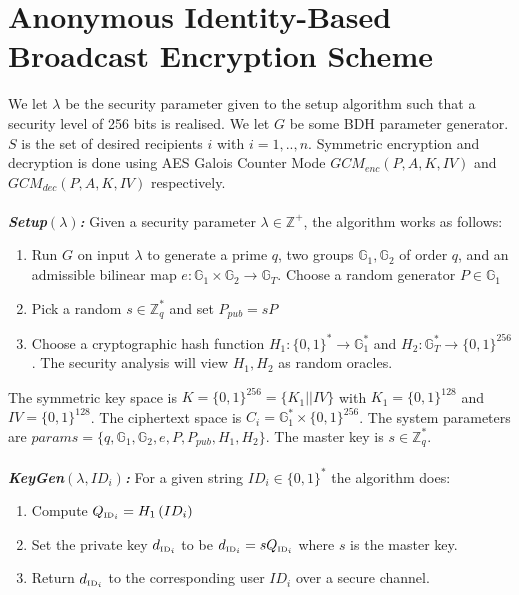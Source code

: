\documentclass[11pt]{article}
\begin{document}
\section*{Anonymous Identity-Based Broadcast Encryption Scheme}
We let $\lambda$ be the security parameter given to the setup algorithm such that a security level of 256 bits is realised. We let $G$ be some BDH parameter generator. $S$ is the set of desired recipients $i$ with $i = 1,..,n$. Symmetric encryption and decryption is done using AES Galois Counter Mode  $GCM_{enc} \left( P, A, K, IV \right)$ and  $GCM_{dec} \left( P, A, K, IV \right)$ respectively.\\
\\
\textbf{\textit{Setup$\left( \lambda \right)$:}} Given a security parameter $\lambda \in \mathds{Z}^{+}$, the algorithm works as follows:
\begin{enumerate}
 \item Run $G$ on input $\lambda$ to generate a prime $q$, two groups $\mathds{G}_1, \mathds{G}_2$ of order $q$, and an admissible bilinear map $e: \mathds{G}_1 \times \mathds{G}_2 \rightarrow \mathds{G}_T$. Choose a random generator $P \in \mathds{G}_1$
 \item Pick a random $s \in \mathds{Z}^{*}_q$ and set $P_{pub} = sP$
 \item Choose a cryptographic hash function $H_1: \{ 0,1 \}^{*} \rightarrow \mathds{G}_1^{*}$ and $H_2: \mathds{G}_T^{*} \rightarrow \{ 0,1 \}^{256}$. The security analysis will view $H_1, H_2$ as random oracles.
\end{enumerate}

The symmetric key space is $K = \{ 0,1 \}^{256} = \{ K_1 || IV \}$ with $K_1 = \{ 0,1 \}^{128}$ and $IV = \{ 0,1 \}^{128}$. The ciphertext space is $C_i = \mathds{G}_1^{*} \times \{ 0,1 \}^{256}$. The system parameters are $params = \{ q, \mathds{G}_1, \mathds{G}_2, e, P, P_{pub}, H_1, H_2  \}$. The master key is $s \in \mathds{Z}_q^{*}$.\\
\\
\textbf{\textit{KeyGen$\left( \lambda,ID_i \right)$:}} For a given string $ID_i \in \{ 0,1 \}^{*}$ the algorithm does:
\begin{enumerate}
 \item Compute $Q_{\textrm{\tiny{ID}}_i} = H_1 \left( ID_{i} \right)$
 \item Set the private key $d_{\textrm{\tiny{ID}}_i}$ to be $d_{\textrm{\tiny{ID}}_i} = s Q_{\textrm{\tiny{ID}}_i}$ where $s$ is the master key.
 \item Return $d_{\textrm{\tiny{ID}}_i}$ to the corresponding user $ID_i$ over a secure channel.
\end{enumerate}
\end{document}

